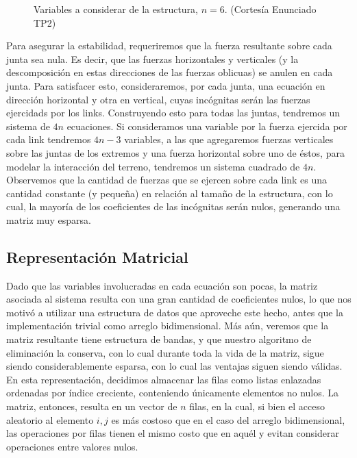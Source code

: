 \begin{figure}[!ht]
\begin{center}

\caption{Variables a considerar de la estructura, $n = 6$. \small{(Cortesía Enunciado TP2)}}
\label{fig:estructuras}
\end{center}
\end{figure}


Para asegurar la estabilidad, requeriremos que la fuerza resultante sobre cada junta sea nula. Es decir, que las fuerzas horizontales y verticales (y la descomposición en estas direcciones de las fuerzas oblicuas) se anulen en cada junta. Para satisfacer esto, consideraremos, por cada junta, una ecuación en dirección horizontal y otra en vertical, cuyas incógnitas serán las fuerzas ejercidads por los links. Construyendo esto para todas las juntas, tendremos un sistema de $4n$ ecuaciones. Si consideramos una variable por la fuerza ejercida por cada link tendremos $4n-3$ variables, a las que agregaremos fuerzas verticales sobre las juntas de los extremos y una fuerza horizontal sobre uno de éstos, para modelar la interacción del terreno, tendremos un sistema cuadrado de $4n$. Observemos que la cantidad de fuerzas que se ejercen sobre cada link es una cantidad constante (y pequeña) en relación al tamaño de la estructura, con lo cual, la mayoría de los coeficientes de las incógnitas serán nulos, generando una matriz muy esparsa.

\subsection{Representación Matricial}
Dado que las variables involucradas en cada ecuación son pocas, la matriz asociada al sistema resulta con una gran cantidad de coeficientes nulos, lo que nos motivó a utilizar una estructura de datos que aproveche este hecho, antes que la implementación trivial como arreglo bidimensional. Más aún, veremos que la matriz resultante tiene estructura de bandas, y que nuestro algoritmo de eliminación la conserva, con lo cual durante toda la vida de la matriz, sigue siendo considerablemente esparsa, con lo cual las ventajas siguen siendo válidas. En esta representación, decidimos almacenar las filas como listas enlazadas ordenadas por índice creciente, conteniendo únicamente elementos no nulos. La matriz, entonces, resulta en un vector de $n$ filas, en la cual, si bien el acceso aleatorio al elemento $i,j$ es más costoso que en el caso del arreglo bidimensional, las operaciones por filas tienen el mismo costo que en aquél y evitan considerar operaciones entre valores nulos.

